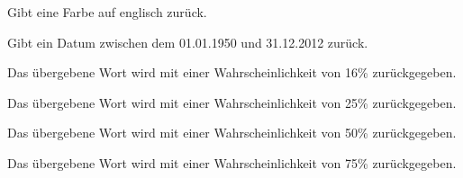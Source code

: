 \documentclass[a4paper,12pt,oneside]{sphinxmanual}
\begin{document}

\begin{fulllineitems}
\label{funktionen:pyzufall.color}
Gibt eine Farbe auf englisch zurück.

\end{fulllineitems}


\begin{fulllineitems}
\label{funktionen:pyzufall.datum}
Gibt ein Datum zwischen dem 01.01.1950 und 31.12.2012 zurück.

\end{fulllineitems}


\begin{fulllineitems}
\label{funktionen:pyzufall.e16}
Das übergebene Wort wird mit einer Wahrscheinlichkeit von 16\% zurückgegeben.

\end{fulllineitems}


\begin{fulllineitems}
\label{funktionen:pyzufall.e25}
Das übergebene Wort wird mit einer Wahrscheinlichkeit von 25\% zurückgegeben.

\end{fulllineitems}


\begin{fulllineitems}
\label{funktionen:pyzufall.e50}
Das übergebene Wort wird mit einer Wahrscheinlichkeit von 50\% zurückgegeben.

\end{fulllineitems}


\begin{fulllineitems}
\label{funktionen:pyzufall.e75}
Das übergebene Wort wird mit einer Wahrscheinlichkeit von 75\% zurückgegeben.

\end{fulllineitems}
\end{document}
